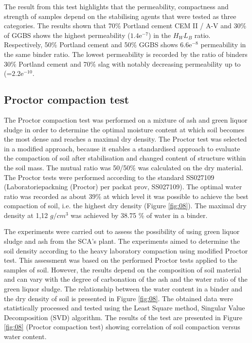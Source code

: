 \documentclass{amestyle}
\begin{document}
The result from this test highlights that the permeability, compactness and strength of samples depend on the stabilising agents that were tested as three categories. The results shown that 70\% Portland cement CEM II / A-V  and 30\% of GGBS shows the highest permeability ($1.4\mathrm{e}^{-7}$) in the $H_WL_B$ ratio. Respectively, 50\% Portland cement and 50\% GGBS shows $6.6\mathrm{e}^{-8}$ permeability in the same binder ratio. The lowest permeability is recorded by the ratio of binders 30\% Portland cement and 70\% slag with notably decreasing permeability up to (=$2.2\mathrm{e}^{-10}$. 

\subsection{Proctor compaction test}
The Proctor compaction test was performed on a mixture of ash and green liquor sludge in order to determine the optimal moisture content at which soil becomes the most dense and reaches a maximal dry density. The Proctor test was selected in a modified approach, because it enables a standardised approach to evaluate the compaction of soil after stabilisation and changed content of structure within the soil mass. The mutual ratio was 50/50\% was calculated on the dry material. The Proctor tests were performed according to the standard SS027109 (Laboratoriepackning (Proctor) per packat prov, SS027109). The optimal water ratio was recorded as about 39\% at which level it was possible to achieve the best compaction of soil, i.e. the highest dry density (Figure \ref{fig:08}). The maximal dry density at 1,12 $g/cm^3$ was achieved by 38.75 \% of water in a binder. 

The experiments were carried out to assess the possibility of using green liquor sludge and ash from the SCA's plant. The experiments aimed to determine the soil density according to the heavy laboratory compaction using modified Proctor test. This assessment was based on the performed Proctor tests applied to the samples of soil. However, the results depend on the composition of soil material and can vary with the degree of carbonation of the ash and the water ratio of the green liquor sludge. The relationship between the water content in a binder and the dry density of soil is presented in Figure \ref{fig:08}. The obtained data were statistically processed and tested using the Least Square method, Singular Value Decomposition (SVD) algorithm. The results of the test are presented in Figure \ref{fig:08} (Proctor compaction test) showing correlation of soil compaction versus water content. 
\end{document}
